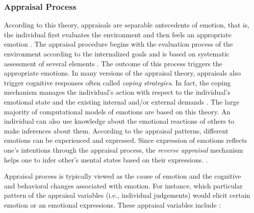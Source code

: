 \documentclass[11pt]{article}
\begin{document}
\subsubsection{Appraisal Process}
\label{sec:appraisal-process}

According to this theory, appraisals are separable antecedents of emotion, that
is, the individual first evaluates the environment and then feels an appropriate
emotion \cite{scherer:appraisal-processes}. The appraisal procedure begins with
the evaluation process of the environment according to the internalized goals
and is based on systematic assessment of several elements
\cite{scherer:sequential-appraisal-process}. The outcome of this process
triggers the appropriate emotions. In many versions of the appraisal theory,
appraisals also trigger cognitive responses often called \textit{coping
strategies}. In fact, the coping mechanism manages the individual's action with
respect to the individual's emotional state and the existing internal and/or
external demands \cite{folkman:coping-pitfalls-promise}. The large majority of
computational models of emotions are based on this theory. An individual can
also use knowledge about the emotional reactions of others to make inferences
about them. According to the appraisal patterns, different emotions can be
experienced and expressed. Since expression of emotions reflects one's
intentions through the appraisal process, the \textit{reverse appraisal}
mechanism helps one to infer other's mental states based on their expressions.
\cite{gratch:reverse-appraisal, hareli:emotional-reaction-perception}.

Appraisal process is typically viewed as the cause of emotion and the cognitive
and behavioral changes associated with emotion. For instance, which particular
pattern of the appraisal variables (i.e., individual judgements) would elicit
certain emotion or an emotional expressions. These appraisal variables
include \cite{marsella:ema-process-model}:\\
\end{document}
